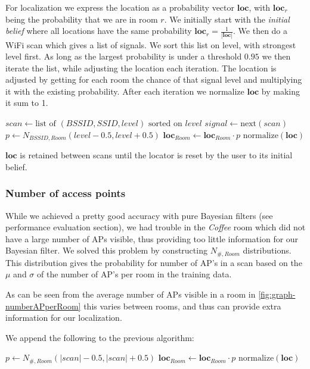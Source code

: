 \documentclass[a4paper,10pt,twoside]{IEEEtran}
\begin{document}
For localization we express the location as a probability vector $\mathbf{loc}$, with $\mathbf{loc}_{r}$ being the probability that we are in room $r$. 
We initially start with the \emph{initial belief} where all locations have the same probability $\mathbf{loc}_r = \frac{1}{|\mathbf{loc}|}$.
We then do a WiFi scan which gives a list of signals.
We sort this list on level, with strongest level first.
As long as the largest probability is under a threshold $0.95$ we then iterate the list, while adjusting the location each iteration.
The location is adjusted by getting for each room the chance of that signal level and multiplying it with the existing probability. After each iteration we normalize $\mathbf{loc}$ by making it sum to 1.
\\
\begin{algorithmic}
	\State $scan \gets \text{list of } (BSSID, SSID, level) \text{ sorted on }level$
		\State $signal \gets \text{next}\left(scan\right)$
			\State $p \gets N_{BSSID,Room}(level-0.5,level+0.5)$
			\State $\mathbf{loc}_{Room} \gets \mathbf{loc}_{Room} \cdot p $
		\EndFor
		\State $\text{normalize}\left(\mathbf{loc}\right)$
	\EndWhile
\end{algorithmic}

$\mathbf{loc}$ is retained between scans until the locator is reset by the user to its initial belief.

\subsubsection{Number of access points}
\label{subsec:loc-numap}

While we achieved a pretty good accuracy with pure Bayesian filters (see performance evaluation section), we had trouble in the \emph{Coffee} room which did not have a large number of APs visible, thus providing too little information for our Bayesian filter.
We solved this problem by constructing $N_{\#,Room}$ distributions.
This distribution gives the probability for number of AP's in a scan based on the $\mu$ and $\sigma$ of the number of AP's per room in the training data.

As can be seen from the average number of APs visible in a room in \autoref{fig:graph-numberAPperRoom} this varies between rooms, and thus can provide extra information for our localization.

We append the following to the previous algorithm:
\\
\begin{algorithmic}
			\State $p \gets N_{\#,Room}(|scan|-0.5,|scan|+0.5)$
			\State $\mathbf{loc}_{Room} \gets \mathbf{loc}_{Room} \cdot p $
		\EndFor
		\State $\text{normalize}\left(\mathbf{loc}\right)$
	\EndIf
\end{algorithmic}
\end{document}
